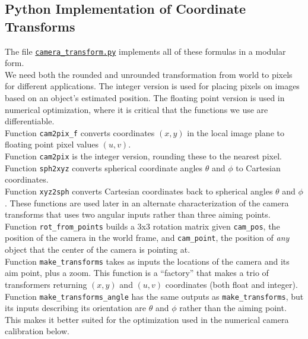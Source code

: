 \documentclass{article}
\begin{document}
\subsection{Python Implementation of Coordinate Transforms}
The file 
\href{https://github.com/Harvard-AM-205-Basketball/Basketball/blob/master/src/camera_transform.py}
{\texttt{camera\_transform.py}}
implements all of these formulas in a modular form. \\
We need both the rounded and unrounded transformation from world to pixels for different applications.
The integer version is used for placing pixels on images based on an object's estimated position.
The floating point version is used in numerical optimization, where it is critical that 
the functions we use are differentiable.\\
Function \texttt{cam2pix\_f} converts coordinates $(x, y)$ in the local image plane to floating point pixel values $(u, v)$.  \\
Function \texttt{cam2pix} is the integer version, rounding these to the nearest pixel. \\
Function \texttt{sph2xyz} converts spherical coordinate angles $\theta$ and $\phi$ to Cartesian coordinates. \\
Function \texttt{xyz2sph} converts Cartesian coordinates back to spherical angles $\theta$ and $\phi$.
These functions are used later in an alternate characterization of the camera transforms that uses two
angular inputs rather than three aiming points.\\
Function \texttt{rot\_from\_points} builds a 3x3 rotation matrix given 
\texttt{cam\_pos}, the position of the camera in the world frame, and
\texttt{cam\_point}, the position of \textit{any} object that the center of the camera is pointing at. \\
Function \texttt{make\_transforms} takes as inputs the locations of the camera and its aim point,
plus a zoom.  This function is a ``factory'' that makes a trio of transformers returning 
$(x, y)$ and $(u, v)$ coordinates (both float and integer). \\
Function \texttt{make\_transforms\_angle} has the same outputs as \texttt{make\_transforms},
but its inputs describing its orientation are $\theta$ and $\phi$ rather than the aiming point.
This makes it better suited for the optimization used in the numerical camera calibration below.
\end{document}
